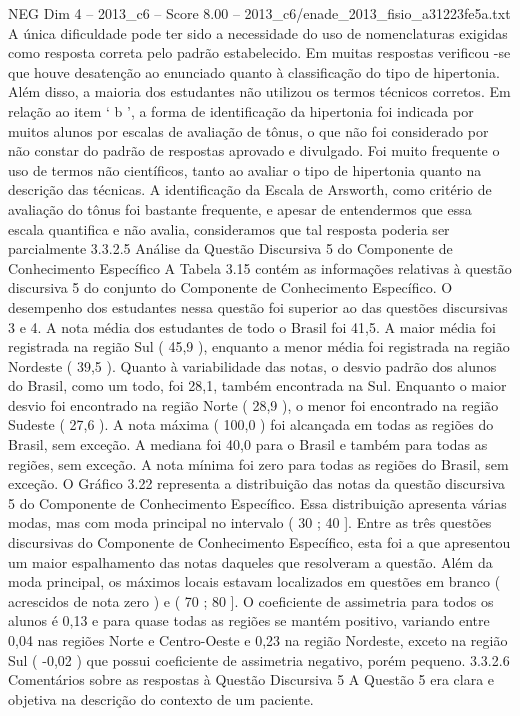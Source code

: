 \begin{textsample}{NEG Dim 4 – 2013\_c6 – Score 8.00 – 2013\_c6/enade\_2013\_fisio\_a31223fe5a.txt}
A única dificuldade pode ter sido a necessidade do uso de nomenclaturas exigidas como resposta correta pelo padrão estabelecido.
Em muitas respostas verificou -se que houve desatenção ao enunciado quanto à classificação do tipo de hipertonia.
Além disso, a maioria dos estudantes não utilizou os termos técnicos corretos.
Em relação ao item ‘ b ’, a forma de identificação da hipertonia foi indicada por muitos alunos por escalas de avaliação de tônus, o que não foi considerado por não constar do padrão de respostas aprovado e divulgado.
Foi muito frequente o uso de termos não científicos, tanto ao avaliar o tipo de hipertonia quanto na descrição das técnicas.
A identificação da Escala de Arsworth, como critério de avaliação do tônus foi bastante frequente, e apesar de entendermos que essa escala quantifica e não avalia, consideramos que tal resposta poderia ser parcialmente 3.3.2.5 Análise da Questão Discursiva 5 do Componente de Conhecimento Específico A Tabela 3.15 contém as informações relativas à questão discursiva 5 do conjunto do Componente de Conhecimento Específico.
O desempenho dos estudantes nessa questão foi superior ao das questões discursivas 3 e 4.
A nota média dos estudantes de todo o Brasil foi 41,5.
A maior média foi registrada na região Sul ( 45,9 ), enquanto a menor média foi registrada na região Nordeste ( 39,5 ).
Quanto à variabilidade das notas, o desvio padrão dos alunos do Brasil, como um todo, foi 28,1, também encontrada na Sul.
Enquanto o maior desvio foi encontrado na região Norte ( 28,9 ), o menor foi encontrado na região Sudeste ( 27,6 ).
A nota máxima ( 100,0 ) foi alcançada em todas as regiões do Brasil, sem exceção.
A mediana foi 40,0 para o Brasil e também para todas as regiões, sem exceção.
A nota mínima foi zero para todas as regiões do Brasil, sem exceção.
O Gráfico 3.22 representa a distribuição das notas da questão discursiva 5 do Componente de Conhecimento Específico.
Essa distribuição apresenta várias modas, mas com moda principal no intervalo ( 30 ; 40 ].
Entre as três questões discursivas do Componente de Conhecimento Específico, esta foi a que apresentou um maior espalhamento das notas daqueles que resolveram a questão.
Além da moda principal, os máximos locais estavam localizados em questões em branco ( acrescidos de nota zero ) e ( 70 ; 80 ].
O coeficiente de assimetria para todos os alunos é 0,13 e para quase todas as regiões se mantém positivo, variando entre 0,04 nas regiões Norte e Centro-Oeste e 0,23 na região Nordeste, exceto na região Sul ( -0,02 ) que possui coeficiente de assimetria negativo, porém pequeno. 3.3.2.6 Comentários sobre as respostas à Questão Discursiva 5 A Questão 5 era clara e objetiva na descrição do contexto de um paciente.

\end{textsample}
